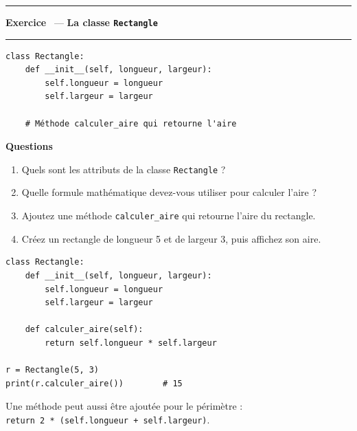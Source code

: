 \documentclass[10pt,a4paper]{article}
\newif\ifcorrige
\newcommand{\py}[1]{\texttt{#1}}
\newcounter{exo}
\newcommand{\exo}[1]{%
  \stepcounter{exo}\par\vspace{4pt}
  \ifcorrige\else\noindent\minipage{\textwidth}\fi
  \noindent\textcolor{qbar}{\rule{2.5pt}{10pt}}\hspace{4pt}%
  \textbf{\color{qbar}Exercice \theexo}\ --- \textbf{#1}%
  \par\nobreak\vspace{-3pt}\noindent\textcolor{qbar!35}{\rule{\textwidth}{0.6pt}}%
  \par\nobreak\vspace{1pt}}
\newenvironment{codebloc}
  {\ifcorrige\else\noindent\minipage[t]{0.50\textwidth}\vspace{0pt}\fi}
  {\ifcorrige\else\endminipage\hfill\fi}
\newenvironment{qbloc}
  {\ifcorrige\else\minipage[t]{0.475\textwidth}\vspace{0pt}\fi
   \textbf{\small Questions}\begin{enumerate}[leftmargin=*,nosep,label=\arabic*.]}
  {\end{enumerate}\ifcorrige\else\endminipage\par\fi}
\newcommand{\rep}[1]{\ifcorrige\par\smallskip{\color{corr}\small#1}\par\smallskip\fi}
\newlength{\zoneadj}\setlength{\zoneadj}{0pt}
\newcommand{\zone}[1][4cm]{%
  \ifcorrige\else
    \par\vspace{2pt}\noindent
    \begin{tcolorbox}[colback=white,colframe=black!45,boxrule=0.5pt,arc=1pt,height={\dimexpr#1-\zoneadj\relax},
      left=4pt,right=4pt,top=2pt,bottom=2pt,
      title={\scriptsize\itshape Réponses},coltitle=black!55,fonttitle=\itshape,
      detach title,before upper={\tcbtitle\par}]\end{tcolorbox}%
    \endminipage\par
  \fi}
\newenvironment{solution}
  {\ifcorrige
     \begin{tcolorbox}[enhanced,breakable,colback=corrbg,colframe=corr,boxrule=0.6pt,arc=1pt,
       left=5pt,right=5pt,top=3pt,bottom=3pt,fontupper=\small,
       title={Corrigé},coltitle=corr,fonttitle=\bfseries\small,detach title,
       before upper={\tcbtitle\par\smallskip}]%
   \else
     \setbox0\vbox\bgroup
   \fi}
  {\ifcorrige\end{tcolorbox}\else\egroup\fi}
\begin{document}
\exo{La classe \py{Rectangle}}
\begin{codebloc}
\begin{lstlisting}
class Rectangle:
    def __init__(self, longueur, largeur):
        self.longueur = longueur
        self.largeur = largeur

    # Méthode calculer_aire qui retourne l'aire
\end{lstlisting}
\end{codebloc}
\begin{qbloc}
  \item Quels sont les attributs de la classe \py{Rectangle} ?
    \rep{\py{longueur} et \py{largeur}.}
  \item Quelle formule mathématique devez-vous utiliser pour calculer l'aire ?
    \rep{$\text{aire} = \text{longueur} \times \text{largeur}$.}
  \item Ajoutez une méthode \py{calculer_aire} qui retourne l'aire du rectangle.
  \item Créez un rectangle de longueur 5 et de largeur 3, puis affichez son aire.
\end{qbloc}
\zone[8.2cm]
\begin{solution}
\begin{lstlisting}
class Rectangle:
    def __init__(self, longueur, largeur):
        self.longueur = longueur
        self.largeur = largeur

    def calculer_aire(self):
        return self.longueur * self.largeur

r = Rectangle(5, 3)
print(r.calculer_aire())        # 15
\end{lstlisting}
Une méthode peut aussi être ajoutée pour le périmètre :\\
\py{return 2 * (self.longueur + self.largeur)}.
\end{solution}
\end{document}
